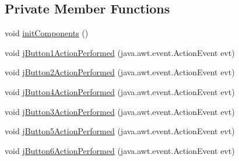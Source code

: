 \subsection*{Private Member Functions}
\begin{DoxyCompactItemize}
\item 
void \mbox{\hyperlink{class_interfaz_package_1_1_interfaz_admin_a11f45ed6f1f629dd84480a501181f823}{init\+Components}} ()
\item 
void \mbox{\hyperlink{class_interfaz_package_1_1_interfaz_admin_aaf879a69301dfeae37ba0aa729170d62}{j\+Button1\+Action\+Performed}} (java.\+awt.\+event.\+Action\+Event evt)
\item 
void \mbox{\hyperlink{class_interfaz_package_1_1_interfaz_admin_a11a622906a9352165bce2b478ff0111c}{j\+Button2\+Action\+Performed}} (java.\+awt.\+event.\+Action\+Event evt)
\item 
void \mbox{\hyperlink{class_interfaz_package_1_1_interfaz_admin_a181786d770ad10741a8673d921056f35}{j\+Button4\+Action\+Performed}} (java.\+awt.\+event.\+Action\+Event evt)
\item 
void \mbox{\hyperlink{class_interfaz_package_1_1_interfaz_admin_a9ac69474400fb921a3fd1118bdd5b5c5}{j\+Button3\+Action\+Performed}} (java.\+awt.\+event.\+Action\+Event evt)
\item 
void \mbox{\hyperlink{class_interfaz_package_1_1_interfaz_admin_a25699f2c1e5c4e59cac723216e386837}{j\+Button5\+Action\+Performed}} (java.\+awt.\+event.\+Action\+Event evt)
\item 
void \mbox{\hyperlink{class_interfaz_package_1_1_interfaz_admin_ad3610dff3e28f93647357a5ba251d465}{j\+Button6\+Action\+Performed}} (java.\+awt.\+event.\+Action\+Event evt)
\end{DoxyCompactItemize}
